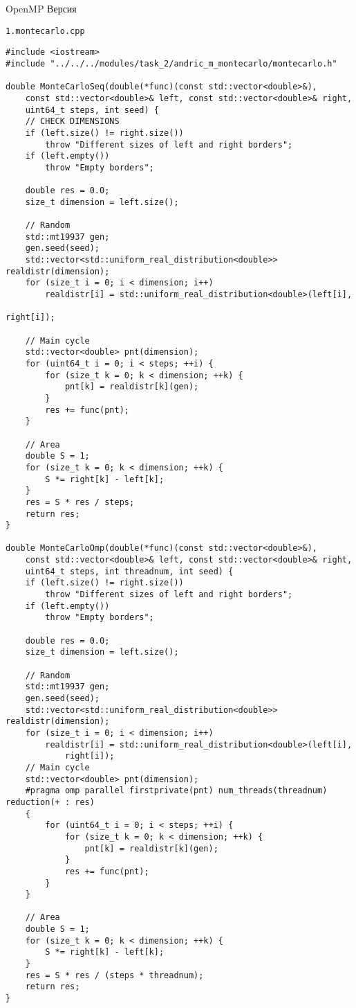\documentclass{report}
\begin{document}
\par OpenMP Версия
\par \verb|1.montecarlo.cpp|
\begin{lstlisting}
#include <iostream>
#include "../../../modules/task_2/andric_m_montecarlo/montecarlo.h"

double MonteCarloSeq(double(*func)(const std::vector<double>&),
    const std::vector<double>& left, const std::vector<double>& right,
    uint64_t steps, int seed) {
    // CHECK DIMENSIONS
    if (left.size() != right.size())
        throw "Different sizes of left and right borders";
    if (left.empty())
        throw "Empty borders";

    double res = 0.0;
    size_t dimension = left.size();

    // Random
    std::mt19937 gen;
    gen.seed(seed);
    std::vector<std::uniform_real_distribution<double>> realdistr(dimension);
    for (size_t i = 0; i < dimension; i++)
        realdistr[i] = std::uniform_real_distribution<double>(left[i],
                                                              right[i]);

    // Main cycle
    std::vector<double> pnt(dimension);
    for (uint64_t i = 0; i < steps; ++i) {
        for (size_t k = 0; k < dimension; ++k) {
            pnt[k] = realdistr[k](gen);
        }
        res += func(pnt);
    }

    // Area
    double S = 1;
    for (size_t k = 0; k < dimension; ++k) {
        S *= right[k] - left[k];
    }
    res = S * res / steps;
    return res;
}

double MonteCarloOmp(double(*func)(const std::vector<double>&),
    const std::vector<double>& left, const std::vector<double>& right,
    uint64_t steps, int threadnum, int seed) {
    if (left.size() != right.size())
        throw "Different sizes of left and right borders";
    if (left.empty())
        throw "Empty borders";

    double res = 0.0;
    size_t dimension = left.size();

    // Random
    std::mt19937 gen;
    gen.seed(seed);
    std::vector<std::uniform_real_distribution<double>> realdistr(dimension);
    for (size_t i = 0; i < dimension; i++)
        realdistr[i] = std::uniform_real_distribution<double>(left[i],
            right[i]);
    // Main cycle
    std::vector<double> pnt(dimension);
    #pragma omp parallel firstprivate(pnt) num_threads(threadnum) reduction(+ : res)
    {
        for (uint64_t i = 0; i < steps; ++i) {
            for (size_t k = 0; k < dimension; ++k) {
                pnt[k] = realdistr[k](gen);
            }
            res += func(pnt);
        }
    }

    // Area
    double S = 1;
    for (size_t k = 0; k < dimension; ++k) {
        S *= right[k] - left[k];
    }
    res = S * res / (steps * threadnum);
    return res;
}
\end{lstlisting}
\end{document}
